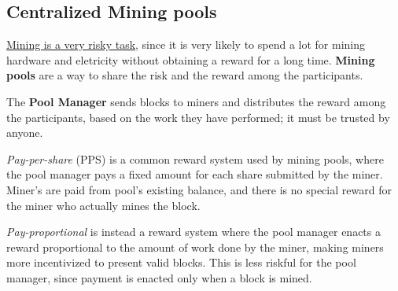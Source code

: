 \subsection{Centralized Mining pools}
\label{sec:mining_pools}
\ul{Mining is a very risky task}, since it is very likely to spend a lot for mining hardware and eletricity without
obtaining a reward for a long time.
\textbf{Mining pools} are a way to share the risk and the reward among the participants. 

The \textbf{Pool Manager} sends blocks to miners and distributes the reward among the participants, based on the work they have performed; it must be trusted by anyone.

\textit{Pay-per-share} (PPS) is a common reward system used by mining pools, where the pool manager pays a fixed amount for each share submitted by the miner.
Miner's are paid from pool's existing balance, and there is no special reward for the miner who actually mines the block.

\textit{Pay-proportional} is instead a reward system where the pool manager enacts a reward proportional to the amount of work done by the miner, making miners more incentivized to present valid blocks.
This is less riskful for the pool manager, since payment is enacted only when a block is mined.

\newpage
